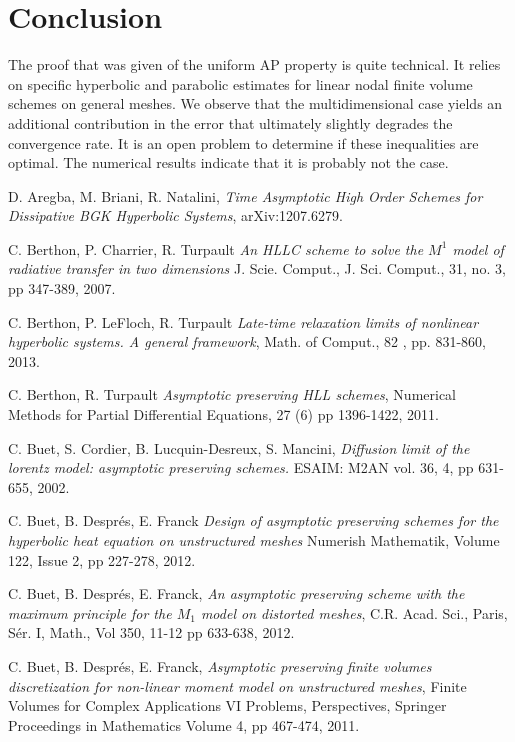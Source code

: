 \documentclass[a4paper,french,english,10pt]{article}
\begin{document}
\section{Conclusion}


The proof that was given of the uniform AP property is quite technical.
It relies on specific hyperbolic and parabolic estimates for linear
nodal finite volume schemes on general meshes.
We observe that the multidimensional case yields an additional contribution in the error
that ultimately slightly degrades the convergence rate.
It is an open problem to determine if these inequalities are optimal.
The numerical results indicate that it is probably not the case.




{\footnotesize 
\begin{thebibliography}{abcde}   

 D. Aregba, M. Briani, R. Natalini, \emph{Time Asymptotic High Order Schemes for Dissipative BGK Hyperbolic Systems}, arXiv:1207.6279.

 C. Berthon, P. Charrier, R. Turpault \emph{An HLLC scheme
to solve the $M^1$ model of radiative transfer in two dimensions} J. Scie.
Comput., J. Sci. Comput., 31, no. 3, pp 347-389, 2007.

 C. Berthon, P. LeFloch, R. Turpault  \emph{Late-time relaxation limits of nonlinear hyperbolic systems. A general framework}, Math. of Comput., 82 , pp. 831-860, 2013. 

 C. Berthon, R. Turpault \emph{Asymptotic preserving HLL
schemes}, Numerical Methods for Partial Differential Equations, 27 (6)  pp
1396-1422, 2011.

 C. Buet, S. Cordier,   B. Lucquin-Desreux, S. Mancini, 
\emph{Diffusion limit of the lorentz model: asymptotic preserving schemes.}
ESAIM: M2AN vol. 36, 4, pp 631-655, 2002.

 C. Buet, B. Despr\'es, E. Franck \emph{Design of
asymptotic preserving schemes for the hyperbolic heat equation on unstructured
meshes} Numerish Mathematik, Volume 122, Issue 2, pp 227-278,  2012.

 C. Buet, B. Despr\'es, E. Franck, \emph{An asymptotic
preserving scheme with the maximum principle for the $M_1$ model on distorted
meshes}, C.R. Acad. Sci., Paris, S\'er. I, Math., Vol 350,  11-12
pp 633-638,  2012.

 C. Buet, B. Despr\'es, E. Franck, \emph{Asymptotic
preserving finite volumes discretization for non-linear moment model on
unstructured meshes}, Finite Volumes for Complex Applications VI Problems,
Perspectives, Springer Proceedings in Mathematics Volume 4, pp 467-474, 2011.




\end{thebibliography}}
\end{document}
